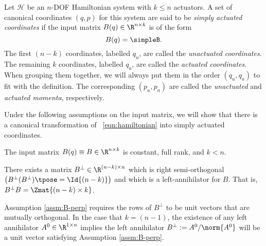 \begin{defn}
    Let \(\mathcal{H}\) be an \(n\)-DOF Hamiltonian system 
    with \(k \leq n\) actuators. 
    A set of canonical coordinates \((q,p)\) for this system
    are said to be \textit{simply actuated coordinates} if the
    input matrix \(B(q) \in \R^{n \times k}\) is of the form
    \[
        B(q) = \simpleB    
        .
    \]
    The first \((n-k)\) coordinates, labelled \(q_u\), are called the
    \textit{unactuated coordinates}. The remaining \(k\) coordinates, labelled
    \(q_a\), are called the \textit{actuated coordinates}. When grouping them
    together, we will always put them in the order \((q_u, q_a)\) to fit with 
    the definition. 
    The corresponding \((p_u, p_a)\) are called the \textit{unactuated} and 
    \textit{actuated momenta}, respectively.
\end{defn}

Under the following assumptions on the input matrix, we will show that there is
a canonical transformation of ~\eqref{eqn:hamiltonian} into simply actuated
coordinates.

\begin{assm}\label{assm:B-const}
    The input matrix \(B(q) \equiv B \in \R^{n\times k}\) is constant,
    full rank, and \(k < n\).
\end{assm}
\begin{assm}\label{assm:B-perp}
    There exists a matrix 
    \(B^\perp \in \R^{(n-k)\times n}\)
    which is right semi-orthogonal 
    \(\left(B^\perp(B^\perp)\tpose = \Id{(n-k)}\right)\)
    and which is a left-annihilator for \(B\). 
    That is, \(B^\perp B = \Zmat{(n-k) \times k}\).
\end{assm}

Assumption \ref{assm:B-perp} requires the rows of \(B^\perp\) to be unit vectors
that are mutually orthogonal. 
In the case that \(k = (n-1)\), the existence of any left annihilator 
\(A^0 \in \R^{1\times n}\) implies the left annihilator 
\(B^\perp := A^0/\norm{A^0}\) will be a unit vector satisfying Assumption \ref{assm:B-perp}.

